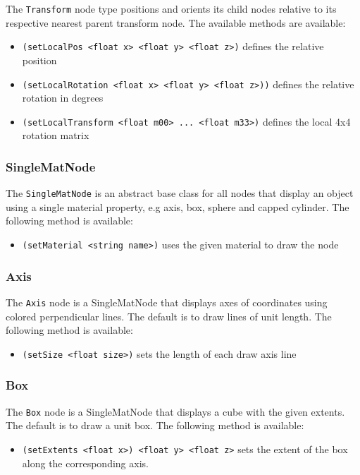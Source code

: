 The \texttt{Transform} node type positions and orients its child nodes
relative to its respective nearest parent transform node. The
available methods are available:

\begin{itemize}
\item \texttt{(setLocalPos <float x> <float y> <float z>)} defines the relative position
\item \texttt{(setLocalRotation <float x> <float y> <float z>))} defines the relative rotation in
  degrees
\item \texttt{(setLocalTransform <float m00> ... <float m33>)}
  defines the local 4x4 rotation matrix
\end{itemize}

\subsubsection{SingleMatNode}
The \texttt{SingleMatNode} is an abstract base class for all nodes
that display an object using a single material property, e.g axis,
box, sphere and capped cylinder. The following method is available:

\begin{itemize}
\item \texttt{(setMaterial <string name>)} uses the given material to draw
  the node
\end{itemize}

\subsubsection{Axis}
The \texttt{Axis} node is a SingleMatNode that displays axes of
coordinates using colored perpendicular lines. The default is to draw
lines of unit length. The following method is available:
\begin{itemize}
\item \texttt{(setSize <float size>)} sets the length of each draw axis line
\end{itemize}

\subsubsection{Box}
The \texttt{Box} node is a SingleMatNode that displays a cube with the
given extents.  The default is to draw a unit box. The following
method is available:

\begin{itemize}
\item \texttt{(setExtents <float x>) <float y> <float z>} sets the extent of
  the box along the corresponding axis.
\end{itemize}

